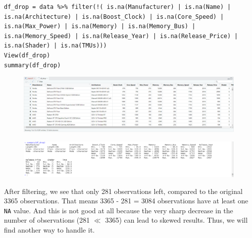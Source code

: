 \documentclass[a4paper]{article}
\begin{document}
\begin{mdframed}[leftline=false,rightline=false,backgroundcolor=lightblue!10,nobreak=false]
    \begin{verbatim}
df_drop = data %>% filter(!( is.na(Manufacturer) | is.na(Name) | is.na(Architecture) | is.na(Boost_Clock) | is.na(Core_Speed) | is.na(Max_Power) | is.na(Memory) | is.na(Memory_Bus) | is.na(Memory_Speed) | is.na(Release_Year) | is.na(Release_Price) | is.na(Shader) | is.na(TMUs)))
View(df_drop)
summary(df_drop)
    \end{verbatim}
\end{mdframed}
\begin{figure}[H]
    \centering
    \includegraphics[keepaspectratio, width=1\textwidth, height=1\textheight]{Clean/df_drop.png}
\end{figure}
\begin{figure}[H]
    \centering
    \includegraphics[keepaspectratio, width=1\textwidth, height=1\textheight]{Clean/df_drop_summary.png}
\end{figure}
After filtering, we see that only 281 observations left, compared to the original 3365 observations. That means 3365 - 281 = 3084 observations have at least one \verb|NA| value. And this is not good at all because the very sharp decrease in the number of observations (281 $\ll$ 3365) can lead to skewed results. Thus, we will find another way to handle it.
\end{document}
